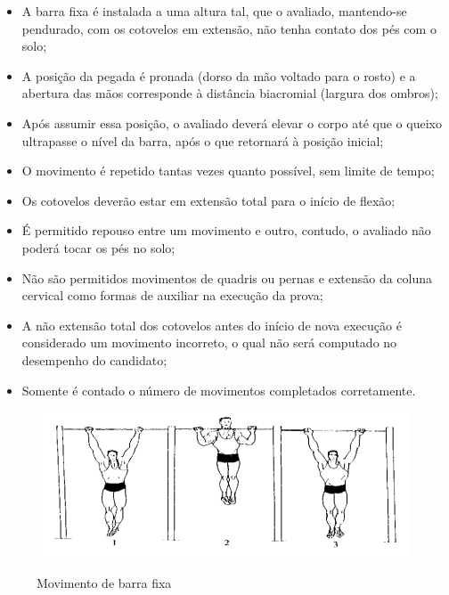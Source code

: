 \begin{itemize}

    \item A barra fixa é instalada a uma altura tal, que o avaliado, mantendo-se pendurado, com os cotovelos em extensão, não tenha contato dos pés com o solo;

    \item A posição da pegada é pronada (dorso da mão voltado para o rosto) e a abertura das mãos corresponde à distância biacromial (largura dos ombros);

    \item Após assumir essa posição, o avaliado deverá elevar o corpo até que o queixo ultrapasse o nível da barra, após o que retornará à posição inicial;
          
    \item O movimento é repetido tantas vezes quanto possível, sem limite de tempo;

    \item Os cotovelos deverão estar em extensão total para o início de flexão;

    \item É permitido repouso entre um movimento e outro, contudo, o avaliado não poderá tocar os pés no solo;

    \item Não são permitidos movimentos de quadris ou pernas e extensão da coluna cervical como formas de auxiliar na execução da prova;

    \item A não extensão total dos cotovelos antes do início de nova execução é considerado um movimento incorreto, o qual não será computado no desempenho do candidato;

    \item Somente é contado o número de movimentos completados corretamente.

\end{itemize}

\begin{figure}[H]
	\centering
    \caption{Movimento de barra fixa}
	\includegraphics[scale=0.7]{figuras/TAF/barraFixa.jpg}
	\label{fig:Movimento de barra fixa}
\end{figure}


